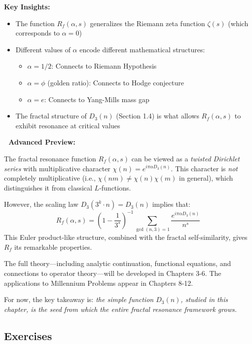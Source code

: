 \textbf{Key Insights:}
\begin{itemize}
\item The function $R_f(\alpha, s)$ generalizes the Riemann zeta function $\zeta(s)$ (which corresponds to $\alpha = 0$)
\item Different values of $\alpha$ encode different mathematical structures:
  \begin{itemize}
  \item $\alpha = 1/2$: Connects to Riemann Hypothesis
  \item $\alpha = \phi$ (golden ratio): Connects to Hodge conjecture
  \item $\alpha = e$: Connects to Yang-Mills mass gap
  \end{itemize}
\item The fractal structure of $D_3(n)$ (Section 1.4) is what allows $R_f(\alpha, s)$ to exhibit resonance at critical values
\end{itemize}

\textbf{🔴 Advanced Preview:}

The fractal resonance function $R_f(\alpha, s)$ can be viewed as a \textit{twisted Dirichlet series} with multiplicative character $\chi(n) = e^{i\pi\alpha D_3(n)}$. This character is \textit{not} completely multiplicative (i.e., $\chi(nm) \neq \chi(n)\chi(m)$ in general), which distinguishes it from classical $L$-functions.

However, the scaling law $D_3(3^k \cdot n) = D_3(n)$ implies that:
\begin{equation}
R_f(\alpha, s) = \left(1 - \frac{1}{3^s}\right)^{-1} \sum_{\gcd(n,3)=1} \frac{e^{i\pi\alpha D_3(n)}}{n^s}
\end{equation}
This Euler product-like structure, combined with the fractal self-similarity, gives $R_f$ its remarkable properties.

The full theory—including analytic continuation, functional equations, and connections to operator theory—will be developed in Chapters 3-6. The applications to Millennium Problems appear in Chapters 8-12.

For now, the key takeaway is: \textit{the simple function $D_3(n)$, studied in this chapter, is the seed from which the entire fractal resonance framework grows.}

\subsection{Exercises}

